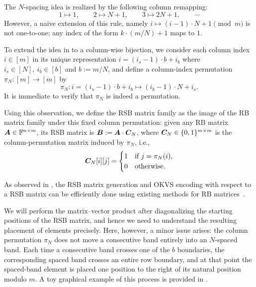 The $N$-spacing idea is realized by the following column remapping:
\begin{equation}\label{eq:spacing_idea}
1 \mapsto 1, \qquad 2 \mapsto N+1, \qquad 3 \mapsto 2N+1, \qquad \cdots
\end{equation}
However, a naive extension of this rule, namely $i \mapsto (i-1)\cdot N + 1 \pmod m$
is not one-to-one; any index of the form $k\cdot (m/N)+1$ maps to $1$.

To extend the idea in  to a column-wise bijection, we consider each column index $i \in [m]$ in its unique representation $i = (i_s - 1)\cdot b + i_b$ where $i_s \in [N],~ i_b \in [b]$ and $b := m/N$, and define a column-index permutation
$\pi_N : [m] \rightarrow [m]$ by $$ 
\pi_N: i = (i_s - 1)\cdot b + i_b   \mapsto   (i_b - 1)\cdot N + i_s.$$
It is immediate to verify that $\pi_N$ is indeed a permutation.

Using this observation, we define the RSB matrix family as the image of the RB matrix family under this fixed column permutation: given any RB matrix $\bm{A} \in \mathbb{F}^{n\times m}$, its RSB matrix is $\bm{B} := \bm{A} \cdot \bm{C}_N$, where $\bm{C}_N \in \{0,1\}^{m \times m}$ is the column-permutation matrix induced by $\pi_N$, i.e.,
\begin{equation}\label{eq:N_perm_mat}
  \bm{C}_N[i][j] =
  \begin{cases}
    1 & \text{if } j = \pi_N(i),\\
    0 & \text{otherwise.}
  \end{cases}
\end{equation}

As observed in , the RSB matrix generation and OKVS encoding with respect to a RSB matrix can be efficiently done using existing methods for RB matrices~\cite{BPSY23}.


We will perform the matrix--vector product after diagonalizing the starting positions of the RSB matrix, and hence we need to understand the resulting placement of elements precisely. Here, however, a minor issue arises: the column permutation $\pi_N$ does not move a consecutive band entirely into an $N$-spaced band. Each time a consecutive band crosses one of the $b$ boundaries, the corresponding spaced band crosses an entire row boundary, and at that point the spaced-band element is placed one position to the right of its natural position modulo $m$. A toy graphical example of this process is provided in .

